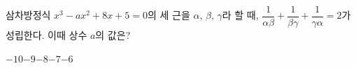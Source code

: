 삼차방정식 $x^3-ax^2+8x+5=0$의 세 근을 $\alpha$, $\beta$, $\gamma$라 할 때, $\dfrac{1}{\alpha\beta}+\dfrac{1}{\beta\gamma}+\dfrac{1}{\gamma\alpha}=2$가 성립한다. 이때 상수 $a$의 값은?
\begin{choices32}{$-10$}{$-9$}{$-8$}{$-7$}{$-6$}\end{choices32}
